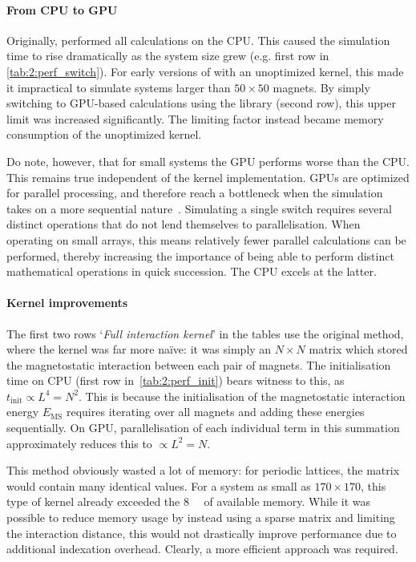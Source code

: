 \paragraph{From CPU to GPU}
Originally, \hotspice performed all calculations on the CPU. %
This caused the simulation time to rise dramatically as the system size grew (e.g. first row in \cref{tab:2:perf_switch}).
For early versions of \hotspice with an unoptimized kernel, this made it impractical to simulate systems larger than $50 \times 50$ magnets.
By simply switching to GPU-based calculations using the  library (second row), this upper limit was increased significantly.
The limiting factor instead became memory consumption of the unoptimized kernel. \par
Do note, however, that for small systems the GPU performs worse than the CPU.
This remains true independent of the kernel implementation.
GPUs are optimized for parallel processing, and therefore reach a bottleneck when the simulation takes on a more sequential nature~\cite{owens2008gpu}.
Simulating a single switch requires several distinct operations that do not lend themselves to parallelisation.
When operating on small arrays, this means relatively fewer parallel calculations can be performed, thereby increasing the importance of being able to perform distinct mathematical operations in quick succession.
The CPU excels at the latter. %

\paragraph{Kernel improvements}
The first two rows `\textit{Full interaction kernel}' in the tables use the original method, where the kernel was far more naïve: it was simply an $N \times N$ matrix which stored the magnetostatic interaction between each pair of magnets.
The initialisation time on CPU (first row in~\cref{tab:2:perf_init}) bears witness to this, as $t_\mathrm{init} \propto L^4 = N^2$.
This is because the initialisation of the magnetostatic interaction energy $E_\mathrm{MS}$ requires iterating over all magnets and adding these energies sequentially.
On GPU, parallelisation of each individual term in this summation approximately reduces this to $\propto L^2 = N$. \par
This method obviously wasted a lot of memory: for periodic lattices, the matrix would contain many identical values. For a system as small as $170 \times 170$, this type of kernel already exceeded the \SI{8}{\giga\byte} of available memory.
While it was possible to reduce memory usage by instead using a sparse matrix and limiting the interaction distance, this would not drastically improve performance due to additional indexation overhead.
Clearly, a more efficient approach was required. \\\par

